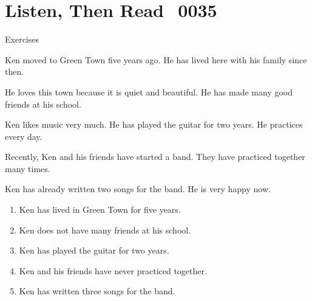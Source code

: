 \documentclass[aspectratio=169,xcolor={dvipsnames,table}]{beamer}
\newcommand{\myaudio}[1]{\href{#1}{\faVolumeUp}}
\begin{document}
\section{Listen, Then Read\,\,\,\,\,{\tiny 0035}\,{\scriptsize \myaudio{./audio/011_have_pp_intro_reading.mp3}}}
\begin{frame}[plain,t]{Exercises}
\vspace*{-8pt}
\begin{spacing}{1}
\begin{tcolorbox}[colframe=ForestGreen,
  colback=NavyBlue!10!white,
  colbacktitle=NavyBlue!40!white,
  coltitle=black, %
before upper={\setlength{\parindent}{1.25em}},
  title={Living in Green Town\hfill{\tiny 0035}\quad{\scriptsize \myaudio{./audio/011_have_pp_intro_reading.mp3}}}
]
\vspace*{-2pt}
\noindent{}Ken moved to Green Town five years ago. He has lived here with his family since then.

He loves this town because it is quiet and beautiful. He has made many good friends at his school.

Ken likes music very much. He has played the guitar for two years. He practices every day.

Recently, Ken and his friends have started a band. They have practiced together many times.

Ken has already written two songs for the band. He is very happy now.
\end{tcolorbox}
\end{spacing}


\vspace{-6pt}
\begin{enumerate}\setlength{\itemsep}{-3.3pt}
\item<2-> Ken has lived in Green Town for five years.\hfill{}
\item<2-> Ken does not have many friends at his school.\hfill{}
\item<2-> Ken has played the guitar for two years.\hfill{}
\item<2-> Ken and his friends have never practiced together.\hfill{}
\item<2-> Ken has written three songs for the band.\hfill{}
\end{enumerate}
\end{frame}
\end{document}
